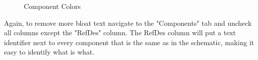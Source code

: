 \begin{figure}[H]
  \centering
\caption{Component Colors}
\label{img:componentColors}
\end{figure}

Again, to remove more bloat text navigate to the "Components" tab and uncheck all columns except the "RefDes" column. The RefDes column
will put a text identifier next to every component that is the same as in the schematic, making it easy to identify what is what.

